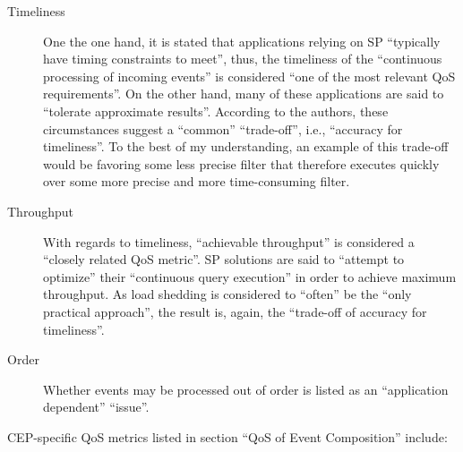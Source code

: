 \documentclass[article, 10pt, type=bsc, colorback, accentcolor=tud8b, parskip=half, bibliography=totocnumbered]{tudthesis}
\begin{document}
\begin{description}
\item[Timeliness]
One the one hand, it is stated that applications relying on SP ``typically have timing constraints to meet'', thus, the timeliness of the ``continuous processing of incoming events'' is considered ``one of the most relevant QoS requirements''.
On the other hand, many of these applications are said to ``tolerate approximate results''.
According to the authors, these circumstances suggest a ``common'' ``trade-off'', i.e., ``accuracy for timeliness''.
To the best of my understanding, an example of this trade-off would be favoring some less precise filter that therefore executes quickly over some more precise and more time-consuming filter.
\item[Throughput]
With regards to timeliness, ``achievable throughput'' is considered a ``closely related QoS metric''.
SP solutions are said to ``attempt to optimize'' their ``continuous query execution'' in order to achieve maximum throughput.
As load shedding is considered to ``often'' be the ``only practical approach'', the result is, again, the ``trade-off of accuracy for timeliness''.
\item[Order]
Whether events may be processed out of order is listed as an ``application dependent'' ``issue''.
\end{description}

CEP-specific QoS metrics listed in section ``QoS of Event Composition'' \cite{Buchmann:2012:CEA:2413516.2413519} include:
\end{document}
